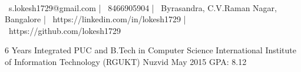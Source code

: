 \documentclass[]{awesome-cv}
\begin{document}
\begin{center}
	  \\
	\vspace{2mm}
	{\faEnvelope\ s.lokesh1729@gmail.com} | {\faMobile\ 8466905904} | {\faMapMarker\ Byrasandra, C.V.Raman Nagar, Bangalore} | {\faLink\ https://linkedin.com/in/lokesh1729} | {\faLink\ https://github.com/lokesh1729}
\end{center}
\begin{cventries}
	\cventry
	{6 Years Integrated PUC and B.Tech in Computer Science}
	{International Institute of Information Technology (RGUKT)}
	{Nuzvid}
	{May 2015}
	{GPA: 8.12}
\end{cventries}
\end{document}
